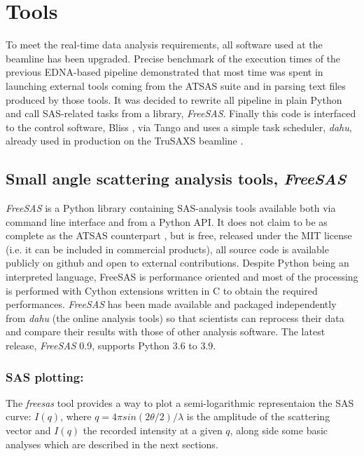 \documentclass[preprint]{iucr}              %
\begin{document}
\section{Tools}

To meet the real-time data analysis requirements, all software used at the beamline has been upgraded.
Precise benchmark of the execution times of the previous EDNA-based pipeline demonstrated that 
most time was spent in launching external tools coming from the ATSAS suite and in parsing text files produced by those tools.
It was decided to rewrite all pipeline in plain Python \cite{python} and call SAS-related tasks from a library, \textit{FreeSAS}. 
Finally this code is interfaced to the control software, Bliss \cite{bliss}, via Tango \cite{tango} and uses a simple task scheduler, \textit{dahu}, already used in production on the TruSAXS beamline \cite{id02_2022}.

\subsection{Small angle scattering analysis tools, \textit{FreeSAS}}

\textit{FreeSAS} is a Python library containing SAS-analysis tools available both via command line interface and from a Python API. 
It does not claim to be as complete as the ATSAS counterpart \cite{ATSAS3},
but is free, released under the MIT license (i.e. it can be included in commercial products), all source code is available publicly on github \cite{freesas} and
open to external contributions.
Despite Python being an interpreted language, FreeSAS is performance oriented and most of the processing is performed with Cython \cite{cython} extensions written in C to obtain the required performances. 
\textit{FreeSAS} has been made available and packaged independently from \textit{dahu} (the online analysis tools) so that scientists can reprocess their data and compare their results with those of other analysis software. 
The latest release, \textit{FreeSAS} 0.9, supports Python 3.6 to 3.9.

\subsubsection{SAS plotting:} The \textit{freesas} tool provides a way to plot a semi-logarithmic representaion the SAS curve: $I(q)$, where $q = 4\pi sin(2\theta/2)/\lambda$ is the amplitude of the scattering vector and $I(q)$ the recorded intensity at a given $q$, along side some basic analyses which are described in the next sections.
\end{document}
